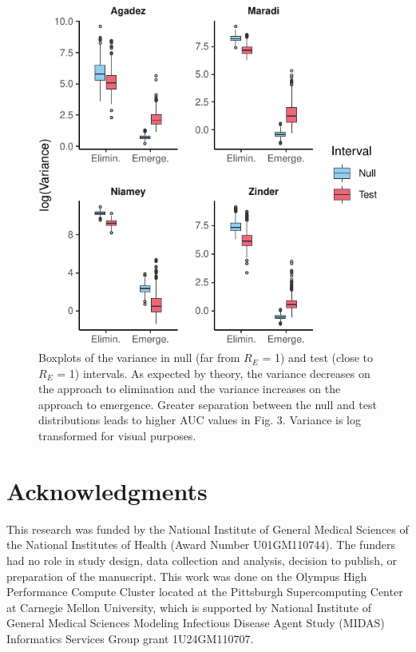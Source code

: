 \documentclass[3p]{elsarticle} %
\makeatletter
\def\maxwidth{\ifdim\Gin@nat@width>\linewidth\linewidth
\else\Gin@nat@width\fi}
\let\Oldincludegraphics\includegraphics
\renewcommand{\includegraphics}[1]{\Oldincludegraphics[width=\maxwidth]{#1}}
\makeatother
\begin{document}
\begin{figure}
\centering
\includegraphics{ms2_files/figure-latex/var-ews-1.pdf}
\caption{Boxplots of the variance in null (far from \(R_E\) = 1) and
test (close to \(R_E\) = 1) intervals. As expected by theory, the
variance decreases on the approach to elimination and the variance
increases on the approach to emergence. Greater separation between the
null and test distributions leads to higher AUC values in Fig. 3.
Variance is log transformed for visual purposes. \label{var-ex}}
\end{figure}

\section{Acknowledgments}\label{acknowledgments}

This research was funded by the National Institute of General Medical
Sciences of the National Institutes of Health (Award Number
U01GM110744). The funders had no role in study design, data collection
and analysis, decision to publish, or preparation of the manuscript.
This work was done on the Olympus High Performance Compute Cluster
located at the Pittsburgh Supercomputing Center at Carnegie Mellon
University, which is supported by National Institute of General Medical
Sciences Modeling Infectious Disease Agent Study (MIDAS) Informatics
Services Group grant 1U24GM110707.
\end{document}
